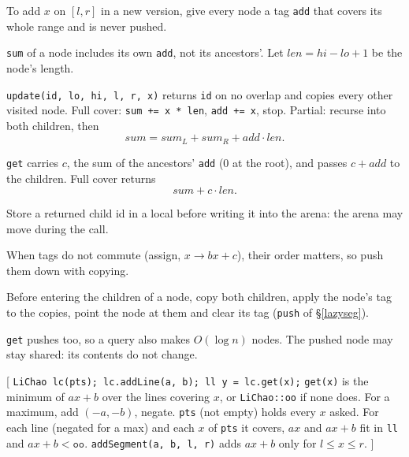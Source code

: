 {\footnotesize\tightdisplay
{}
To add $x$ on $[l, r]$ in a new version, give every node a tag \texttt{add} that covers its whole range and is never pushed.
\begin{facts}
	\item \texttt{sum} of a node includes its own \texttt{add}, not its ancestors'. Let $\mathit{len} = \mathit{hi} - \mathit{lo} + 1$ be the node's length.
	\item \texttt{update(id, lo, hi, l, r, x)} returns \texttt{id} on no overlap and copies every other visited node. Full cover: \texttt{sum += x * len}, \texttt{add += x}, stop. Partial: recurse into both children, then
	\[ \mathit{sum} = \mathit{sum}_L + \mathit{sum}_R + \mathit{add} \cdot \mathit{len}. \]
	\item \texttt{get} carries $c$, the sum of the ancestors' \texttt{add} (0 at the root), and passes $c + \mathit{add}$ to the children. Full cover returns
	\[ \mathit{sum} + c \cdot \mathit{len}. \]
	\item Store a returned child id in a local before writing it into the arena: the arena may move during the call.
\end{facts}
When tags do not commute (assign, $x \to bx + c$), their order matters, so push them down with copying.
\begin{facts}
	\item Before entering the children of a node, copy both children, apply the node's tag to the copies, point the node at them and clear its tag (\texttt{push} of \S\ref{lazyseg}).
	\item \texttt{get} pushes too, so a query also makes $O(\log n)$ nodes. The pushed node may stay shared: its contents do not change.
\end{facts}
}
[
	 \texttt{LiChao lc(pts); lc.addLine(a, b); ll y = lc.get(x);}
	 \texttt{get(x)} is the minimum of $ax + b$ over the lines covering $x$, or \texttt{LiChao::oo} if none does. For a maximum, add $(-a, -b)$, negate.
	 \texttt{pts} (not empty) holds every $x$ asked. For each line (negated for a max) and each $x$ of \texttt{pts} it covers, $ax$ and $ax + b$ fit in \texttt{ll} and $ax + b < \texttt{oo}$.
	 \texttt{addSegment(a, b, l, r)} adds $ax + b$ only for $l \le x \le r$.
]\label{lichao}

